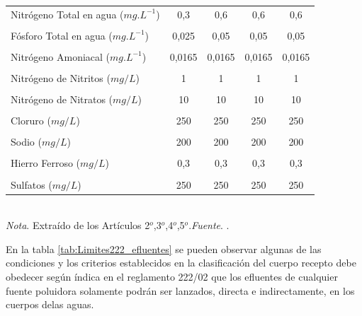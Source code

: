 \begin{table}[htpb]
\begin{tabular}{lcccc}
Nitr\'ogeno Total en agua ($mg.L^{-1}$) & 0,3       & 0,6        & 0,6        & 0,6        \\
                                        &           &            &            &            \\
F\'osforo Total en agua ($mg.L^{-1}$)   & 0,025     & 0,05       & 0,05       & 0,05       \\
                                        &           &            &            &            \\
Nitr\'ogeno Amoniacal ($mg.L^{-1}$)       & 0,0165    & 0,0165     & 0,0165     & 0,0165     \\
                                        &           &            &            &            \\
Nitr\'ogeno de Nitritos ($mg/L$)          & 1         & 1          & 1          & 1          \\
                                        &           &            &            &            \\
Nitr\'ogeno de Nitratos ($mg/L$)          & 10        & 10         & 10         & 10         \\
                                    &           &            &            &            \\ 
Cloruro ($mg /L$)                       & 250       & 250        & 250        & 250        \\
                                        &           &            &            &            \\
Sodio ($mg/L$)                          & 200       & 200        & 200        & 200        \\
                                        &           &            &            &            \\
Hierro Ferroso ($mg/L$)                 & 0,3       & 0,3        & 0,3        & 0,3        \\
                                        &           &            &            &            \\
Sulfatos ($mg/L$)                       & 250       & 250        & 250        & 250       \\
\bottomrule
\end{tabular}
\\
\bigskip
\small \textit{Nota}. Extra\'ido de los Art\'iculos 2$^{o}$,3$^{o}$,4$^{o}$,5$^{o}$.\textit{Fuente}. \cite{la-secretaria-del-ambiente-2002}.
\end{table}
En la tabla \ref{tab:Limites222_efluentes} se pueden observar algunas de las  condiciones y los criterios establecidos en la clasificaci\'on del cuerpo recepto debe obedecer seg\'un \'indica en el reglamento 222/02 que los efluentes de cualquier fuente poluidora solamente podr\'an ser lanzados, directa e indirectamente, en los cuerpos delas aguas.

